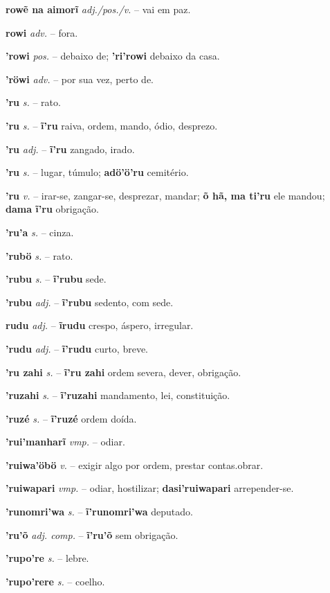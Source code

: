 \textbf{rowẽ na aimorĩ} \textit{adj./pos./v.} -- vai em paz.

\textbf{rowi} \textit{adv.} -- fora.

\textbf{'rowi} \textit{pos.} -- debaixo de; \textbf{'ri'rowi} debaixo da casa.

\textbf{'röwi} \textit{adv.} -- por sua vez, perto de.

\textbf{'ru} \textit{s.} -- rato.

\textbf{'ru} \textit{s.} -- \textbf{ĩ'ru} raiva, ordem, mando, ódio, desprezo.

\textbf{'ru} \textit{adj.} -- \textbf{ĩ'ru} zangado, irado.

\textbf{'ru} \textit{s.} -- lugar, túmulo; \textbf{adö'ö'ru} cemitério.

\textbf{'ru} \textit{v.} -- irar-se, zangar-se, desprezar, mandar; \textbf{õ hã, ma ti'ru} ele mandou; \textbf{dama ĩ'ru} obrigação.

\textbf{'ru'a} \textit{s.} -- cinza.

\textbf{'rubö} \textit{s.} -- rato.

\textbf{'rubu} \textit{s.} -- \textbf{ĩ'rubu} sede.

\textbf{'rubu} \textit{adj.} -- \textbf{ĩ'rubu} sedento, com sede.

\textbf{rudu} \textit{adj.} -- \textbf{ĩrudu} crespo, áspero, irregular.

\textbf{'rudu} \textit{adj.} -- \textbf{ĩ'rudu} curto, breve.

\textbf{'ru zahi} \textit{s.} -- \textbf{ĩ'ru zahi} ordem severa, dever, obrigação.

\textbf{'ruzahi} \textit{s.} -- \textbf{ĩ'ruzahi} mandamento, lei, constituição.

\textbf{'ruzé} \textit{s.} -- \textbf{ĩ'ruzé} ordem doída.

\textbf{'rui'manharĩ} \textit{vmp.} -- odiar.

\textbf{'ruiwa'öbö} \textit{v.} -- exigir algo por ordem, prestar contas.obrar.

\textbf{'ruiwapari} \textit{vmp.} -- odiar, hostilizar; \textbf{dasi'ruiwapari} arrepender-se.

\textbf{'runomri'wa} \textit{s.} -- \textbf{ĩ'runomri'wa} deputado.

\textbf{'ru'õ} \textit{adj. comp.} -- \textbf{ĩ'ru'õ} sem obrigação.

\textbf{'rupo're} \textit{s.} -- lebre.

\textbf{'rupo'rere} \textit{s.} -- coelho.

